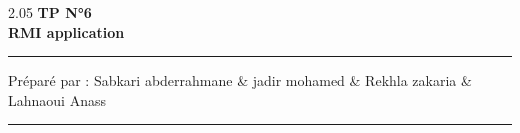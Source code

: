 \documentclass[a4paper,12pt]{report}
\begin{document}
\begin{center}
    \begin{spacing}{2.05}
        {\bf\Large TP N°6 \\ \Large {RMI application}}
    \end{spacing}
\end{center}

\vspace{-1.5cm}
\rule{\linewidth}{0.5mm}
Préparé par : Sabkari abderrahmane \& jadir mohamed \& Rekhla zakaria \& Lahnaoui Anass
\\
\rule{\linewidth}{0.5mm}


\let\clearpage\relax
\newpage
\end{document}
